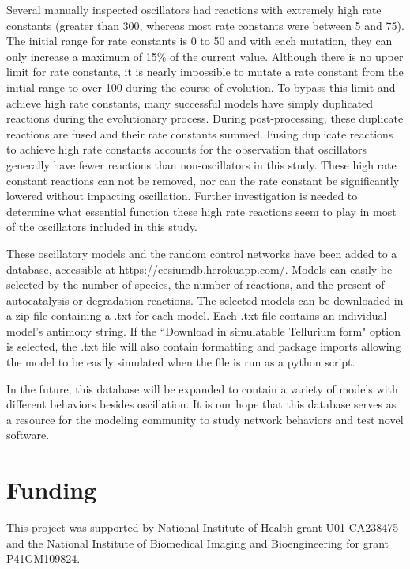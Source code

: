 \documentclass[12pt]{report}
\begin{document}
Several manually inspected oscillators had reactions with extremely high rate constants (greater than 300, whereas most rate constants were between 5 and 75). The initial range for rate constants is 0 to 50 and with each mutation, they can only increase a maximum of 15\% of the current value. Although there is no upper limit for rate constants, it is nearly impossible to mutate a rate constant from the initial range to over 100 during the course of evolution. To bypass this limit and achieve high rate constants, many successful models have simply duplicated reactions during the evolutionary process. During post-processing, these duplicate reactions are fused and their rate constants summed. Fusing duplicate reactions to achieve high rate constants accounts for the observation that oscillators generally have fewer reactions than non-oscillators in this study. These high rate constant reactions can not be removed, nor can the rate constant be significantly lowered without impacting oscillation. Further investigation is needed to determine what essential function these high rate reactions seem to play in most of the oscillators included in this study. 


These oscillatory models and the random control networks have been added to a database, accessible at \url{https://cesiumdb.herokuapp.com/}. Models can easily be selected by the number of species, the number of reactions, and the present of autocatalysis or degradation reactions. The selected models can be downloaded in a zip file containing a .txt for each model. Each .txt file contains an individual model's antimony string. If the ``Download in simulatable Tellurium form" option is selected, the .txt file will also contain formatting and package imports allowing the model to be easily simulated when the file is run as a python script. 

In the future, this database will be expanded to contain a variety of models with different behaviors besides oscillation. It is our hope that this database serves as a resource for the modeling community to study network behaviors and test novel software.


\section*{Funding}
This project was supported by National Institute of Health grant U01 CA238475 and the National Institute of Biomedical Imaging and Bioengineering for grant P41GM109824.
\end{document}
